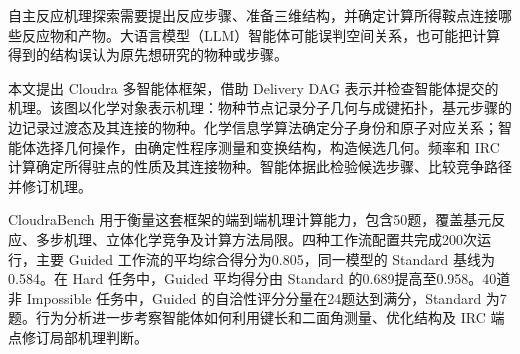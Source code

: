 自主反应机理探索需要提出反应步骤、准备三维结构，并确定计算所得鞍点连接哪些反应物和产物。大语言模型（LLM）智能体可能误判空间关系，也可能把计算得到的结构误认为原先想研究的物种或步骤。

本文提出 Cloudra 多智能体框架，借助 Delivery DAG 表示并检查智能体提交的机理。该图以化学对象表示机理：物种节点记录分子几何与成键拓扑，基元步骤的边记录过渡态及其连接的物种。化学信息学算法确定分子身份和原子对应关系；智能体选择几何操作，由确定性程序测量和变换结构，构造候选几何。频率和 IRC 计算确定所得驻点的性质及其连接物种。智能体据此检验候选步骤、比较竞争路径并修订机理。

CloudraBench 用于衡量这套框架的端到端机理计算能力，包含50题，覆盖基元反应、多步机理、立体化学竞争及计算方法局限。四种工作流配置共完成200次运行，主要 Guided 工作流的平均综合得分为0.805，同一模型的 Standard 基线为0.584。在 Hard 任务中，Guided 平均得分由 Standard 的0.689提高至0.958。40道非 Impossible 任务中，Guided 的自洽性评分分量在24题达到满分，Standard 为7题。行为分析进一步考察智能体如何利用键长和二面角测量、优化结构及 IRC 端点修订局部机理判断。
